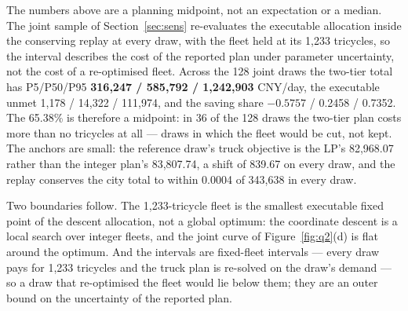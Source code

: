 The numbers above are a planning midpoint, not an expectation or a median. The joint
sample of Section~\ref{sec:sens} re-evaluates the executable allocation inside the
conserving replay at every draw, with the fleet held at its 1,233 tricycles, so the
interval describes the cost of the reported plan under parameter uncertainty, not the
cost of a re-optimised fleet. Across the 128 joint draws the two-tier total has
P5/P50/P95 \textbf{316,247 / 585,792 / 1,242,903} CNY/day, the executable unmet
1,178 / 14,322 / 111,974, and the saving share $-0.5757$ / 0.2458 / 0.7352. The 65.38\%
is therefore a midpoint: in 36 of the 128 draws the two-tier plan costs more than no
tricycles at all --- draws in which the fleet would be cut, not kept. The anchors are
small: the reference draw's truck objective is the LP's 82,968.07 rather than the integer
plan's 83,807.74, a shift of 839.67 on every draw, and the replay conserves the city
total to within 0.0004 of 343,638 in every draw.

Two boundaries follow. The 1,233-tricycle fleet is the smallest executable fixed point
of the descent allocation, not a global optimum: the coordinate descent is a local
search over integer fleets, and the joint curve of Figure~\ref{fig:q2}(d) is flat
around the optimum. And the intervals are fixed-fleet intervals --- every draw pays for
1,233 tricycles and the truck plan is re-solved on the draw's demand --- so a draw that
re-optimised the fleet would lie below them; they are an outer bound on the
uncertainty of the reported plan.
